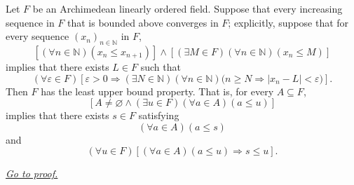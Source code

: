 \begin{theorem}
\label{thm:monotone-convergence-implies-lub-property}
Let $F$ be an Archimedean linearly ordered field.  Suppose that every
increasing sequence in $F$ that is bounded above converges in $F$; explicitly,
suppose that for every sequence $(x_n)_{n\in\mathbb{N}}$ in $F$,
\[
  \left[(\forall n\in\mathbb{N})(x_n\leq x_{n+1})\right]
  \land
  \left[(\exists M\in F)(\forall n\in\mathbb{N})(x_n\leq M)\right]
\]
implies that there exists $L\in F$ such that
\[
  (\forall\varepsilon\in F)\left[
  \varepsilon>0
  \Longrightarrow
  (\exists N\in\mathbb{N})(\forall n\in\mathbb{N})
  \bigl(n\geq N\Longrightarrow |x_n-L|<\varepsilon\bigr)
  \right].
\]
Then $F$ has the least upper bound property.  That is, for every
$A\subseteq F$,
\[
  \left[
  A\neq\varnothing
  \land
  (\exists u\in F)(\forall a\in A)(a\leq u)
  \right]
\]
implies that there exists $s\in F$ satisfying
\[
  (\forall a\in A)(a\leq s)
\]
and
\[
  (\forall u\in F)\left[
  (\forall a\in A)(a\leq u)
  \Longrightarrow
  s\leq u
  \right].
\]

\smallskip
\noindent
\hyperref[prf:monotone-convergence-implies-lub-property]{\textit{Go to proof.}}
\end{theorem}